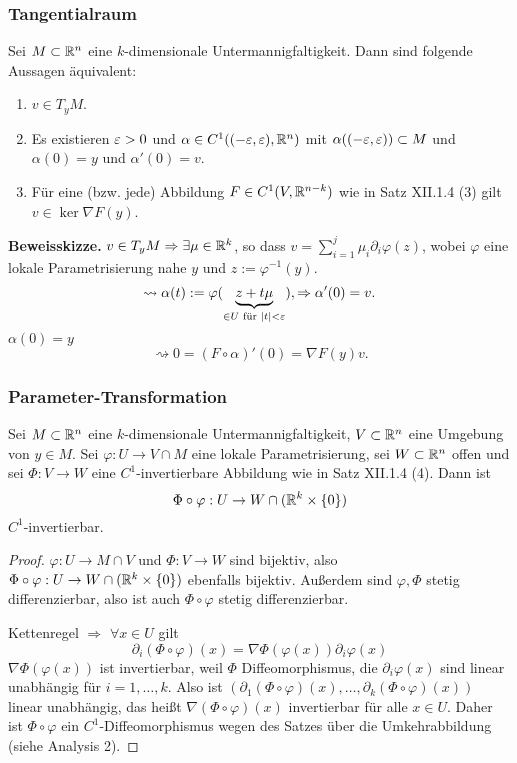 \subsubsection{Tangentialraum}
\begin{thm}
 Sei $M \subset \mathbb{R}^n$ eine $k$-dimensionale Untermannigfaltigkeit. Dann sind folgende Aussagen äquivalent:
 \begin{enumerate}
  \item $v \in T_y M$.
  \item Es existieren $\varepsilon > 0$ und $\alpha \in C^1((-\varepsilon,\varepsilon),\mathbb{R}^n)$ mit $\alpha((-\varepsilon,\varepsilon)) \subset M$ und $\alpha(0) = y$ und $\alpha'(0) = v$.
  \item Für eine (bzw. jede) Abbildung $F \in C^1(V,\mathbb{R}^{n-k})$ wie in Satz XII.1.4 (3) gilt $v \in \ker \nabla F(y)$.
 \end{enumerate}
\end{thm}

\textbf{Beweisskizze.}
 $v \in T_y M \Rightarrow \exists \mu \in \mathbb{R}^k$, so dass $v = \sum_{i=1}^j \mu_i \partial_i \varphi(z)$, wobei $\varphi$ eine lokale Parametrisierung nahe $y$ und $z := \varphi^{-1}(y)$.
 \[ \rightsquigarrow \alpha(t) := \varphi( \underbrace{z + t\mu}_{\in U \text{ für } |t| < \varepsilon} ), \Rightarrow \alpha'(0) = v. \]
 $\alpha(0) = y$
 \[ \rightsquigarrow 0 = (F \circ \alpha)'(0) = \nabla F( y ) v. \]

\clearpage
 
\subsubsection{Parameter-Transformation}
\begin{lem}
 Sei $M \subset \mathbb{R}^n$ eine $k$-dimensionale Untermannigfaltigkeit, $V \subset \mathbb{R}^n$ eine Umgebung von $y \in M$. Sei $\varphi: U \to V \cap M$ eine lokale Parametrisierung\footnotemark, sei $W \subset \mathbb{R}^n$ offen und sei $\Phi:V \to W$ eine $C^1$-invertierbare Abbildung wie in Satz XII.1.4 (4). Dann ist
 \[ \Phi \circ \varphi : U \to W \cap ( \mathbb{R}^k \times\{ 0 \} ) \]
 $C^1$-invertierbar.
\end{lem}

\begin{proof}
 $\varphi: U \to M \cap V$ und $\Phi: V \to W$ sind bijektiv, also $\Phi \circ \varphi: U \to W \cap (\mathbb{R}^k \times \{ 0 \})$ ebenfalls bijektiv. Außerdem sind $\varphi, \Phi$ stetig differenzierbar, also ist auch $\Phi \circ \varphi$ stetig differenzierbar.
 
 Kettenregel $\Rightarrow$ $\forall x \in U$ gilt
 \[ \partial_i ( \Phi \circ \varphi )( x ) = \nabla \Phi(\varphi(x)) \partial_i \varphi(x) \]
 $\nabla \Phi(\varphi(x))$ ist invertierbar, weil $\Phi$ Diffeomorphismus, die $\partial_i \varphi(x)$ sind linear unabhängig für $i=1,\ldots,k$. Also ist $(\partial_1 (\Phi \circ \varphi)(x), \ldots, \partial_k (\Phi \circ \varphi)(x))$ linear unabhängig, das heißt $\nabla( \Phi \circ \varphi )(x)$ invertierbar für alle $x \in U$. Daher ist $\Phi \circ \varphi$ ein $C^1$-Diffeomorphismus wegen des Satzes über die Umkehrabbildung (siehe Analysis 2).
\end{proof}

